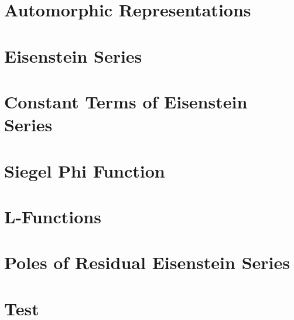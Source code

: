 \documentclass[12pt, openany]{book}
\numberwithin{equation}{section}
\begin{document}
\chapter{Automorphic Representations}

\chapter{Eisenstein Series}

\chapter{Constant Terms of Eisenstein Series}

\chapter{Siegel Phi Function}

\chapter{L-Functions}

\chapter{Poles of Residual Eisenstein Series}



    \appendix
\chapter{Test}


\listoftodos
{}


\newpage


\end{document}
